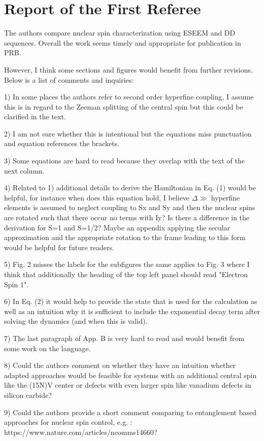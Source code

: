 \documentclass[12pt]{amsart}
\begin{document}
	\color{red} \section{ Report of the First Referee}
	The authors compare nuclear spin characterization using ESEEM and DD
	sequences. Overall the work seems timely and appropriate for
	publication in PRB.
	
	However, I think some sections and figures would benefit from further
	revisions. Below is a list of comments and inquiries:
	
	1) In some places the authors refer to second order hyperfine
	coupling, I assume this is in regard to the Zeeman splitting of the
	central spin but this could be clarified in the text.
	
	2) I am not sure whether this is intentional but the equations miss
	punctuation and equation references the brackets.
	
	3) Some equations are hard to read because they overlap with the text
	of the next column.
	
	4) Related to 1) additional details to derive the Hamiltonian in Eq.
	(1) would be helpful, for instance when does this equation hold, I
	believe $\Delta \gg$ hyperfine elements is assumed to neglect coupling to Sx and
	Sy and then the nuclear spins are rotated such that there occur no
	terms with Iy? Is there a difference in the derivation for S=1 and
	S=1/2? Maybe an appendix applying the secular approximation and the
	appropriate rotation to the frame leading to this form would be
	helpful for future readers.
	
	5) Fig. 2 misses the labels for the subfigures the same applies to
	Fig. 3 where I think that additionally the heading of the top left
	panel should read "Electron Spin 1".
	
	6) In Eq. (2) it would help to provide the state that is used for the
	calculation as well as an intuition why it is sufficient to include
	the exponential decay term after solving the dynamics (and when this
	is valid).
	
	7) The last paragraph of App. B is very hard to read and would benefit
	from some work on the language.
	
	8) Could the authors comment on whether they have an intuition whether
	adapted approaches would be feasible for systems with an additional
	central spin like the (15N)V center or defects with even larger spin
	like vanadium defects in silicon carbide?
	
	9) Could the authors provide a short comment comparing to entanglement
	based approaches for nuclear spin control, e.g. : \\
	https://www.nature.com/articles/ncomms14660?
	
\end{document}
